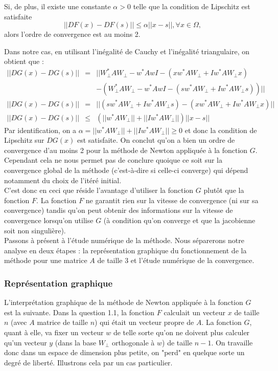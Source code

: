 Si, de plus, il existe une constante $\alpha > 0$ telle que la condition de Lipschitz est satisfaite
$$||DF(x) - DF(s)|| \leq \alpha || x - s||, \forall x \in \Omega,$$
alors l'ordre de convergence est au moins 2. 

Dans notre cas, en utilisant l'inégalité de Cauchy et l'inégalité triangulaire, on obtient que : 
\begin{eqnarray}
||DG(x) - DG(s)|| &=& ||W_{\perp}^{*} A W_{\perp}- w^{*} A wI - (xw^*AW_{\bot}+Iw^*AW_{\bot}x)\\
 & & - (W_{\perp}^{*} A W_{\perp}- w^{*} A wI - (sw^*AW_{\bot}+Iw^*AW_{\bot}s))|| \nonumber \\
||DG(x) - DG(s)|| &=&  ||(sw^*AW_{\bot}+Iw^*AW_{\bot}s) - (xw^*AW_{\bot}+Iw^*AW_{\bot}x) || \\
 ||DG(x) - DG(s)|| &\leq & (||w^*AW_{\bot}|| + || Iw^*AW_{\bot} ||) || x-s ||
\end{eqnarray}
Par identification, on a $\alpha = ||w^*AW_{\bot}|| + || Iw^*AW_{\bot} || \geq 0$ et donc la condition de Lipschitz sur $DG(x)$ est satisfaite. On conclut qu'on a bien un ordre de convergence d'au moins 2 pour la méthode de Newton appliquée à la fonction $G$. Cependant cela ne nous permet pas de conclure quoique ce soit sur la convergence global de la méthode (c'est-à-dire si celle-ci converge) qui dépend notamment du choix de l'itéré initial.\\
C'est donc en ceci que réside l'avantage d'utiliser la fonction $G$ plutôt que la fonction $F$. La fonction $F$ ne garantit rien sur la vitesse de convergence (ni sur sa convergence) tandis qu'on peut obtenir des informations sur la vitesse de convergence lorsqu'on utilise $G$ (à condition qu'on converge et que la jacobienne soit non singulière).\\

Passons à présent à l'étude numérique de la méthode. Nous séparerons notre analyse en deux étapes : la représentation graphique du fonctionnement de la méthode pour une matrice $A$ de taille 3 et l'étude numérique de la convergence.

\subsubsection*{Représentation graphique}
L'interprétation graphique de la méthode de Newton appliquée à la fonction $G$ est la suivante. Dans la question 1.1, la fonction $F$ calculait un vecteur $x$ de taille $n$ (avec $A$ matrice de taille $n$) qui était un vecteur propre de $A$. La fonction $G$, quant à elle, va fixer un vecteur $w$ de telle sorte qu'on ne doivent plus calculer qu'un vecteur $y$ (dans la base $W_{\bot}$ orthogonale à $w$) de taille $n-1$. On travaille donc dans un espace de dimension plus petite, on "perd" en quelque sorte un degré de liberté. Illustrons cela par un cas particulier.\\


